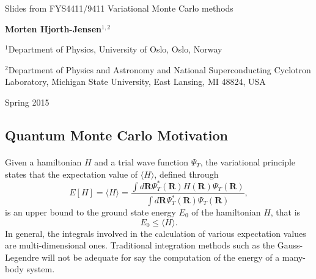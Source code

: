 \documentclass[%
twoside,                 %
final,                   %
10pt]{article}
\begin{document}




\thispagestyle{empty}

\begin{center}
{\LARGE\bf
\begin{spacing}{1.25}
Slides from FYS4411/9411 Variational Monte Carlo methods
\end{spacing}
}
\end{center}


\begin{center}
{\bf Morten Hjorth-Jensen${}^{1, 2}$} \\ [0mm]
\end{center}

    \begin{center}
\centerline{{\small ${}^1$Department of Physics, University of Oslo, Oslo, Norway}}
\centerline{{\small ${}^2$Department of Physics and Astronomy and National Superconducting Cyclotron Laboratory, Michigan State University, East Lansing, MI 48824, USA}}
\end{center}
    

\begin{center} %
Spring 2015
\end{center}

\vspace{1cm}


\subsection*{Quantum Monte Carlo Motivation}

\paragraph{}
Given a hamiltonian $H$ and a trial wave function $\Psi_T$, the variational principle states that the expectation value of $\langle H \rangle$, defined through 
\[
   E[H]= \langle H \rangle =
   \frac{\int d\bm{R}\Psi^{\ast}_T(\bm{R})H(\bm{R})\Psi_T(\bm{R})}
        {\int d\bm{R}\Psi^{\ast}_T(\bm{R})\Psi_T(\bm{R})},
\]
is an upper bound to the ground state energy $E_0$ of the hamiltonian $H$, that is 
\[
    E_0 \le \langle H \rangle .
\]
In general, the integrals involved in the calculation of various  expectation values  are multi-dimensional ones. Traditional integration methods such as the Gauss-Legendre will not be adequate for say the  computation of the energy of a many-body system.
\end{document}
